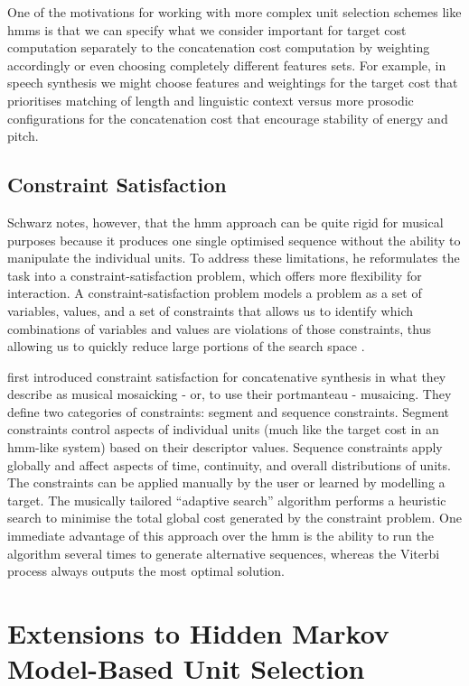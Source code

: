 {{{{{{{One of the motivations for working with more complex unit selection schemes like \acrshort{hmm}s is that we can specify what we consider important for target cost computation separately to the concatenation cost computation by weighting accordingly or even choosing completely different features sets. For example, in speech synthesis we might choose features and weightings for the target cost that prioritises matching of length and linguistic context versus more prosodic configurations for the concatenation cost that encourage stability of energy and pitch.

\subsection{Constraint Satisfaction}

Schwarz notes, however, that the \acrshort{hmm} approach can be quite rigid for musical purposes because it produces one single optimised sequence without the ability to manipulate the individual units. To address these limitations, he reformulates the task into a constraint-satisfaction problem, which offers more flexibility for interaction. A constraint-satisfaction problem models a problem as a set of variables, values, and a set of constraints that allows us to identify which combinations of variables and values are violations of those constraints, thus allowing us to quickly reduce large portions of the search space \citep{Nierhaus2009}. 

\cite{Zils2001} first introduced constraint satisfaction for concatenative synthesis in what they describe as musical mosaicking - or, to use their portmanteau - musaicing. They define two categories of constraints: segment and sequence constraints. Segment constraints control aspects of individual units (much like the target cost in an \acrshort{hmm}-like system) based on their descriptor values. Sequence constraints apply globally and affect aspects of time, continuity, and overall distributions of units. The constraints can be applied manually by the user or learned by modelling a target. The musically tailored “adaptive search” algorithm performs a heuristic search to minimise the total global cost generated by the constraint problem. One immediate advantage of this approach over the \acrshort{hmm} is the ability to run the algorithm several times to generate alternative sequences, whereas the Viterbi process always outputs the most optimal solution. 

\section{Extensions to Hidden Markov Model-Based Unit Selection}

}}}}}}}
